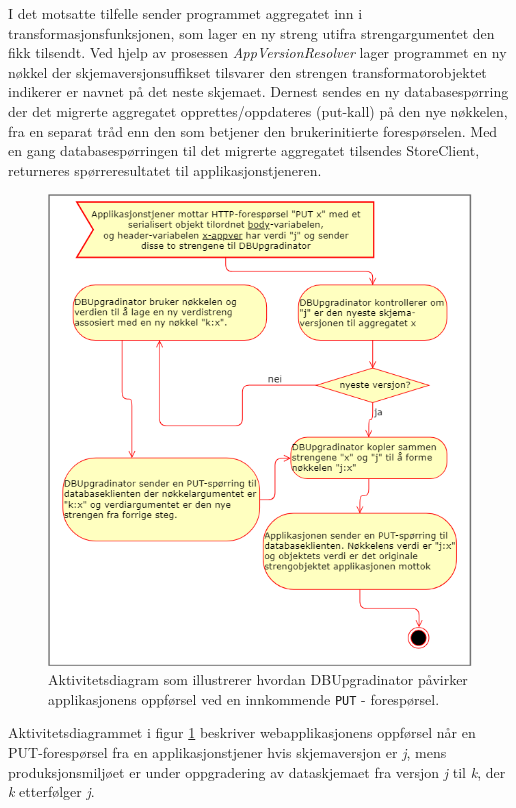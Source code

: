 I det motsatte tilfelle sender programmet aggregatet inn i transformasjonsfunksjonen, som lager en ny streng utifra strengargumentet den fikk tilsendt. Ved hjelp av prosessen \emph{AppVersionResolver} lager programmet en ny nøkkel der skjemaversjon\-suffikset tilsvarer den strengen transformatorobjektet indikerer er navnet på det neste skjemaet. Dernest sendes en ny databasespørring der det migrerte aggregatet opprettes/oppdateres (put-kall) på den nye nøkkelen, fra en separat tråd enn den som betjener den brukerinitierte forespørselen. Med en gang databasespørringen til det migrerte aggregatet tilsendes StoreClient, returneres spørreresultatet til applikasjonstjeneren.

\newpage

\begin{figure}[hbtp]
    \centering
    \includegraphics[scale=0.5]{fig/dbupgradinator-prosess-3.png}
    \caption{Aktivitetsdiagram som illustrerer hvordan DBUpgradinator påvirker applikasjonens oppførsel ved en innkommende \texttt{PUT} - forespørsel.}
    \label{fig9}
\end{figure}

Aktivitetsdiagrammet i figur \ref{fig9} beskriver webapplikasjonens oppførsel når en PUT-forespørsel fra en applikasjonstjener hvis skjemaversjon er \emph{j}, mens produksjonsmiljøet er under oppgradering av dataskjemaet fra versjon \emph{j} til \emph{k}, der \emph{k} etterfølger \emph{j}.

